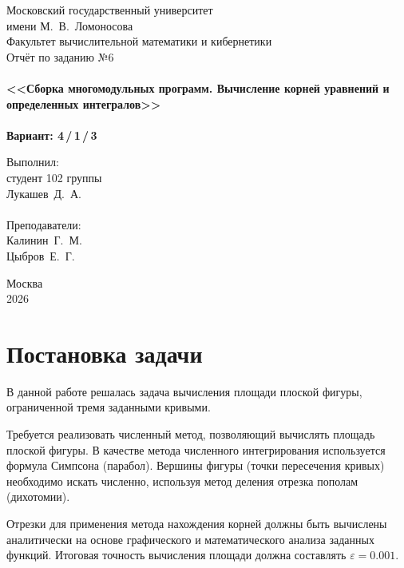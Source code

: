 \documentclass[a4paper,12pt,titlepage,final]{article}
\begin{document}
\begin{titlepage}
\begin{center}
{\small \sc Московский государственный университет \\имени М.~В.~Ломоносова\\
Факультет вычислительной математики и кибернетики\\}
\vfill
{\Large \sc Отчёт по заданию №6}\\
~\\
{\large \bf <<Сборка многомодульных программ. Вычисление корней уравнений и определенных интегралов>>}\\
~\\
{\large \bf Вариант: 4\,/\,1\,/\,3}
\end{center}
\begin{flushright}
\vfill {Выполнил:\\
студент 102 группы\\
Лукашев~Д.~А.\\
~\\
Преподаватели:\\
Калинин~Г.~М.\\
Цыбров~Е.~Г.}
\end{flushright}
\begin{center}
\vfill
{\small Москва\\2026}
\end{center}
\end{titlepage}

\tableofcontents
\newpage

\section{Постановка задачи}
В данной работе решалась задача вычисления площади плоской фигуры, ограниченной тремя заданными кривыми. 

Требуется реализовать численный метод, позволяющий вычислять площадь плоской фигуры.
В качестве метода численного интегрирования используется формула Симпсона (парабол).
Вершины фигуры (точки пересечения кривых) необходимо искать численно,
используя метод деления отрезка пополам (дихотомии). 

Отрезки для применения метода нахождения корней должны быть вычислены аналитически
на основе графического и математического анализа заданных функций.
Итоговая точность вычисления площади должна составлять $\varepsilon = 0.001$.
\end{document}
